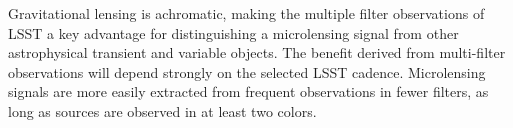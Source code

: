 Gravitational lensing is achromatic, making the multiple filter observations of LSST a key advantage for distinguishing a microlensing signal from other astrophysical transient and variable objects.
The benefit derived from multi-filter observations will depend strongly on the selected LSST cadence. 
Microlensing signals are more easily extracted from frequent observations in fewer filters, as long as sources are observed in at least two colors. 





